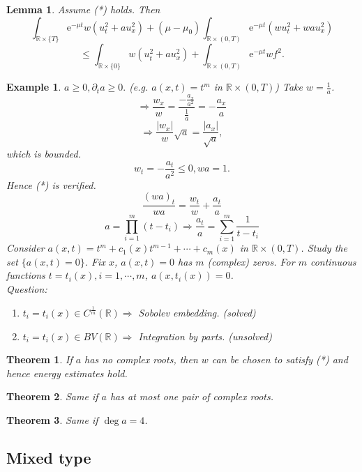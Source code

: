 \documentclass[12pt]{article}
\newtheorem{example}{Example}
\newtheorem{lemma}{Lemma}
\newtheorem{theorem}{Theorem}
\begin{document}
\begin{lemma}
Assume (*) holds. Then
\[\int_{\mathbb{R}\times\{T\}}\mathrm{e}^{-\mu t}w\left(u_t^2+au_x^2 \right)+(\mu-\mu_0)\int_{\mathbb{R}\times(0,T)}\mathrm{e}^{-\mu t}\left(wu_t^2+wau_x^2 \right)\]
\[\le\int_{\mathbb{R}\times\{0\}}w\left(u_t^2+au_x^2 \right)+\int_{\mathbb{R}\times(0,T)}\mathrm{e}^{-\mu t}wf^2. \]
\end{lemma}
\begin{example}
$a\ge0,\partial_t a\ge 0. $ (e.g. $a(x,t)=t^m $ in $\mathbb{R}\times(0,T) $) Take $w=\frac{1}{a} $.
\[\Rightarrow \frac{w_x}{w}=\frac{-\frac{a_x}{a^2}}{\frac{1}{a}}=-\frac{a_x}{a} \]
\[\Rightarrow \frac{|w_x|}{w}\sqrt{a}=\frac{|a_x|}{\sqrt{a}}, \]
which is bounded.
\[w_t=-\frac{a_t}{a^2}\le0,wa=1. \]
Hence (*) is verified.
\[\frac{(wa)_t}{wa}=\frac{w_t}{w}+\frac{a_t}{a} \]
\[a=\prod_{i=1}^m(t-t_i)\Rightarrow \frac{a_t}{a}=\sum_{i=1}^m\frac{1}{t-t_i} \]
Consider $a(x,t)=t^m+c_1(x)t^{m-1}+\cdots+c_m(x) $ in $\mathbb{R}\times(0,T)$. Study the set $\{a(x,t)=0 \}$. Fix $x$, $a(x,t)=0$ has $m$ (complex) zeros. For $m$ continuous functions $t=t_i(x),i=1,\cdots,m$, $a(x,t_i(x))=0$.\\
Question:
\begin{enumerate}
\item $t_i=t_i(x)\in C^{\frac{1}{m}}(\mathbb{R})\Rightarrow $ Sobolev embedding. (solved)
\item $t_i=t_i(x)\in BV(\mathbb{R})\Rightarrow$ Integration by parts. (unsolved)
\end{enumerate}
\end{example}

\begin{theorem}
If $a$ has no complex roots, then $w$ can be chosen to satisfy (*) and hence energy estimates hold.
\end{theorem}
\begin{theorem}
Same if $a$ has at most one pair of complex roots.
\end{theorem}
\begin{theorem}
Same if $\deg a=4$.
\end{theorem}

\subsection{Mixed type}
\end{document}
